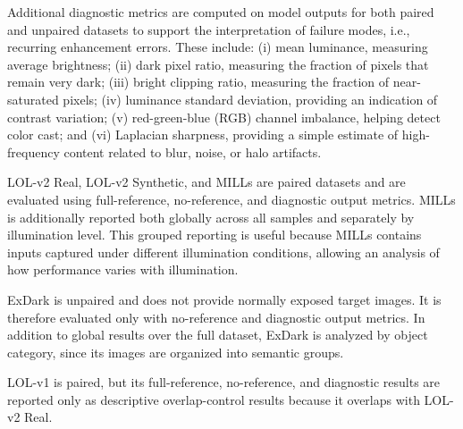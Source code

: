 Additional diagnostic metrics are computed on model outputs for both paired and unpaired datasets to support the interpretation of failure modes, i.e., recurring enhancement errors. These include: (i) mean luminance, measuring average brightness; (ii) dark pixel ratio, measuring the fraction of pixels that remain very dark; (iii) bright clipping ratio, measuring the fraction of near-saturated pixels; (iv) luminance standard deviation, providing an indication of contrast variation; (v) red-green-blue (RGB) channel imbalance, helping detect color cast; and (vi) Laplacian sharpness, providing a simple estimate of high-frequency content related to blur, noise, or halo artifacts.

LOL-v2 Real, LOL-v2 Synthetic, and MILLs are paired datasets and are evaluated using full-reference, no-reference, and diagnostic output metrics. MILLs is additionally reported both globally across all samples and separately by illumination level. This grouped reporting is useful because MILLs contains inputs captured under different illumination conditions, allowing an analysis of how performance varies with illumination.

ExDark is unpaired and does not provide normally exposed target images. It is therefore evaluated only with no-reference and diagnostic output metrics. In addition to global results over the full dataset, ExDark is analyzed by object category, since its images are organized into semantic groups.

LOL-v1 is paired, but its full-reference, no-reference, and diagnostic results are reported only as descriptive overlap-control results because it overlaps with LOL-v2 Real.